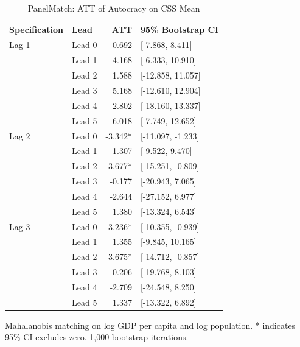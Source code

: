 \begin{table}[htbp]
\caption{\label{tab:panelmatch} PanelMatch: ATT of Autocracy on CSS Mean}
\bigskip
\centering
\begin{tabular}{llrl}
\toprule
Specification & Lead & ATT & 95\% Bootstrap CI \\
\midrule
  Lag 1 & Lead 0 & 0.692 & [-7.868, 8.411] \\
   & Lead 1 & 4.168 & [-6.333, 10.910] \\
   & Lead 2 & 1.588 & [-12.858, 11.057] \\
   & Lead 3 & 5.168 & [-12.610, 12.904] \\
   & Lead 4 & 2.802 & [-18.160, 13.337] \\
   & Lead 5 & 6.018 & [-7.749, 12.652] \\
\midrule
  Lag 2 & Lead 0 & -3.342* & [-11.097, -1.233] \\
   & Lead 1 & 1.307 & [-9.522, 9.470] \\
   & Lead 2 & -3.677* & [-15.251, -0.809] \\
   & Lead 3 & -0.177 & [-20.943, 7.065] \\
   & Lead 4 & -2.644 & [-27.152, 6.977] \\
   & Lead 5 & 1.380 & [-13.324, 6.543] \\
\midrule
  Lag 3 & Lead 0 & -3.236* & [-10.355, -0.939] \\
   & Lead 1 & 1.355 & [-9.845, 10.165] \\
   & Lead 2 & -3.675* & [-14.712, -0.857] \\
   & Lead 3 & -0.206 & [-19.768, 8.103] \\
   & Lead 4 & -2.709 & [-24.548, 8.250] \\
   & Lead 5 & 1.337 & [-13.322, 6.892] \\
\bottomrule
\end{tabular}
\par \raggedright
Mahalanobis matching on log GDP per capita and log population. * indicates 95\% CI excludes zero. 1,000 bootstrap iterations.
\end{table}
